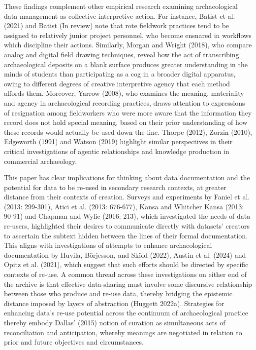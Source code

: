 \documentclass[
]{article}
\begin{document}
These findings complement other empirical research examining
archaeological data management as collective interpretive action. For
instance, Batist et al. (2021) and Batist (In review) note that rote
fieldwork practices tend to be assigned to relatively junior project
personnel, who become ensnared in workflows which discipline their
actions. Similarly, Morgan and Wright (2018), who compare analog and
digital field drawing techniques, reveal how the act of transcribing
archaeological deposits on a blank surface produces greater
understanding in the minds of students than participating as a cog in a
broader digital apparatus, owing to different degrees of creative
interpretive agency that each method affords them. Moreover, Yarrow
(2008), who examines the meaning, materiality and agency in
archaeological recording practices, draws attention to expressions of
resignation among fieldworkers who were more aware that the information
they record does not hold special meaning, based on their prior
understanding of how these records would actually be used down the line.
Thorpe (2012), Zorzin (2010), Edgeworth (1991) and Watson (2019)
highlight similar perspectives in their critical investigations of
agentic relationships and knowledge production in commercial
archaeology.

This paper has clear implications for thinking about data documentation
and the potential for data to be re-used in secondary research contexts,
at greater distance from their contexts of creation. Surveys and
experiments by Faniel et al. (2013: 299-301), Atici et al. (2013:
676-677), Kansa and Whitcher Kansa (2013: 90-91) and Chapman and Wylie
(2016: 213), which investigated the needs of data re-users, highlighted
their desires to communicate directly with datasets' creators to
ascertain the subtext hidden between the lines of their formal
documentation. This aligns with investigations of attempts to enhance
archaeological documentation by Huvila, Börjesson, and Sköld (2022),
Austin et al. (2024) and Opitz et al. (2021), which suggest that such
efforts should be directed by specific contexts of re-use. A common
thread across these investigations on either end of the archive is that
effective data-sharing must involve some discursive relationship between
those who produce and re-use data, thereby bridging the epistemic
distance imposed by layers of abstraction (Huggett 2022a). Strategies
for enhancing data's re-use potential across the continuum of
archaeological practice thereby embody Dallas' (2015) notion of curation
as simultaneous acts of reconciliation and anticipation, whereby
meanings are negotiated in relation to prior and future objectives and
circumstances.
\end{document}
